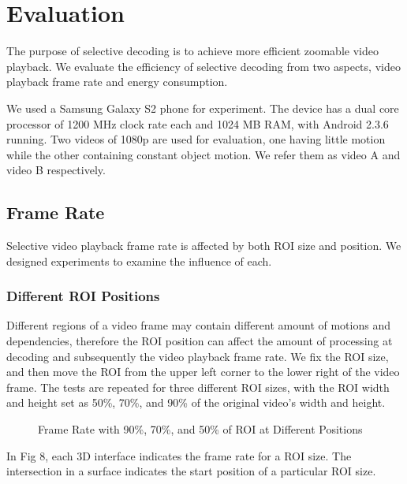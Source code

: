 \section{Evaluation}
The purpose of selective decoding is to achieve more efficient zoomable video playback. We evaluate the efficiency of selective decoding from two aspects, video playback frame rate and energy consumption. 

We used a Samsung Galaxy S2 phone for experiment. The device has a dual core processor of 1200 MHz clock rate each and 1024 MB RAM, with Android 2.3.6 running. Two videos of 1080p are used for evaluation, one having little motion while the other containing constant object motion. We refer them as video A and video B respectively. 

\subsection{Frame Rate}
Selective video playback frame rate is affected by both ROI size and position. We designed experiments to examine the influence of each. 

\subsubsection{Different ROI Positions}
Different regions of a video frame may contain different amount of motions and dependencies, therefore the ROI position can affect the amount of processing at decoding and subsequently the video playback frame rate. We fix the ROI size, and then move the ROI from the upper left corner to the lower right of the video frame. The tests are repeated for three different ROI sizes, with the ROI width and height set as 50\%, 70\%, and 90\% of the original video's width and height. 

\begin{figure}
\centering
\caption{Frame Rate with 90\%, 70\%, and 50\% of ROI at Different Positions}
\end{figure}
In Fig 8, each 3D interface indicates the frame rate for a ROI size. The intersection in a surface indicates the start position of a particular ROI size. 

